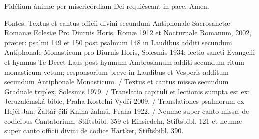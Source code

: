 \documentclass[a4paper, twoside, 12pt]{article}
\begin{document}
\pagebreak

\raggedcolumns

\cantusSineNeumas

\label{capitulum}
 


\trCapituliJudaei

\vfill



\noindent \trVersusVespI

\vfill

\vfill




\vfill



\vfill


\vfill
\pagebreak


\trOrationis

\vfill


\vfill

\noindent \Vbardot{} Fidélium ánimæ per misericórdiam Dei requiéscant in pace.
\Rbardot{} Amen.

\trFideliumAnimae

\vfill
\newpage
\RemoveSideThumbs
\pagestyle{empty}

\vfill

Fontes.
Textus et cantus officii divini secundum
Antiphonale Sacrosanctæ Romanæ Eclesiæ Pro Diurnis Horis, Romæ 1912
et Nocturnale Romanum, 2002, præter: psalmi 149 et 150 post
psalmum 148 in Laudibus additi secundum Antiphonale Monasticum pro Diurnis Horis,
Solesmis 1934; lectio sancti Evangelii et hymnus Te Decet Laus post hymnum
Ambrosianum additi secundum ritum monasticum vetum; responsorium breve
in Laudibus et Vesperis additum secundum Antiphonale Monasticum. /
Textus et cantus missæ secundum
Graduale triplex, Solesmis 1979. /
Translatio capituli et lectionis sumpta est ex:
Jeruzalémská bible, Praha-Kostelní Vydří 2009. /
Translationes psalmorum ex
Hejčl Jan: Žaltář čili Kniha žalmů, Praha 1922. /
Neumæ super canto missæ de codicibus Cantatorium, Stiftsbibl. 359 et Einsiedeln,
Stiftsbibl. 121 et neumæ super canto officii divini de codice Hartker,
Stiftsbibl. 390.
\end{document}
